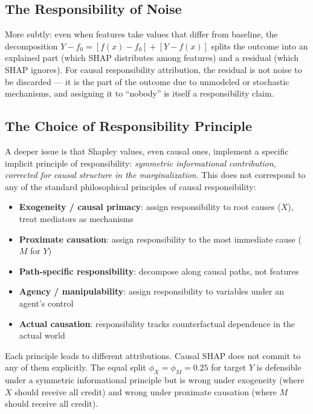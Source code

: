 \documentclass[12pt]{article}
\begin{document}
\subsection{The Responsibility of Noise}

More subtly: even when features take values that differ from baseline, the decomposition
$Y - f_0 = [f(x) - f_0] + [Y - f(x)]$ splits the outcome into an explained part (which
SHAP distributes among features) and a residual (which SHAP ignores). For causal responsibility
attribution, the residual is not noise to be discarded --- it is the part of the outcome
due to unmodeled or stochastic mechanisms, and assigning it to ``nobody'' is itself a
responsibility claim.

\subsection{The Choice of Responsibility Principle}

A deeper issue is that Shapley values, even causal ones, implement a specific implicit
principle of responsibility: \emph{symmetric informational contribution, corrected for
causal structure in the marginalization}. This does not correspond to any of the standard
philosophical principles of causal responsibility:

\begin{itemize}
\item \textbf{Exogeneity / causal primacy}: assign responsibility to root causes ($X$),
      treat mediators as mechanisms
\item \textbf{Proximate causation}: assign responsibility to the most immediate cause ($M$
      for $Y$)
\item \textbf{Path-specific responsibility}: decompose along causal paths, not features
\item \textbf{Agency / manipulability}: assign responsibility to variables under an agent's
      control
\item \textbf{Actual causation}: responsibility tracks counterfactual dependence in the
      actual world
\end{itemize}

Each principle leads to different attributions. Causal SHAP does not commit to any of them
explicitly. The equal split $\phi_X = \phi_M = 0.25$ for target $Y$ is defensible under a
symmetric informational principle but is wrong under exogeneity (where $X$ should receive
all credit) and wrong under proximate causation (where $M$ should receive all credit).
\end{document}
